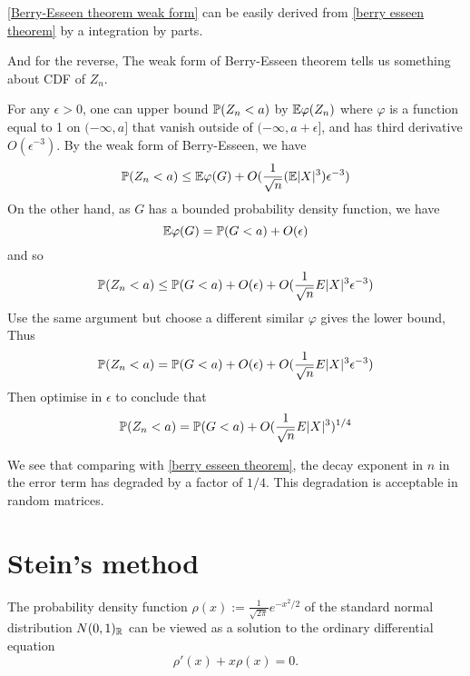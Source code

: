 \ref{Berry-Esseen theorem weak form} can be easily derived from \ref{berry esseen theorem} by a integration by parts. 

And for the reverse, The weak form of Berry-Esseen theorem tells us something about CDF of $Z_n$.

For any $\epsilon > 0$, one can upper bound $\mathbb{P}(Z_n<a)$ by $\mathbb{E} \varphi(Z_n)$ where $\varphi$ is a function equal to 1 on $(-\infty,a]$ that vanish outside of $(-\infty,a+\epsilon]$, and has third derivative $O(\epsilon^{-3})$. By the weak form of Berry-Esseen, we have 
\begin{equation*}
    \mathbb{P}(Z_n<a)\leq \mathbb{E} \varphi(G)+O(\frac{1}{\sqrt{n}}(\mathbb{E} |X|^3)\epsilon^{-3})
\end{equation*}
On the other hand, as $G$ has a bounded probability density function, we have
\begin{equation*}
    \mathbb{E} \varphi(G) = \mathbb{P}(G<a)+O(\epsilon)
\end{equation*}
and so 
\begin{equation*}
    \mathbb{P}(Z_n <a)\leq \mathbb{P}(G<a)+O(\epsilon)+O(\frac{1}{\sqrt{n}}E|X|^3\epsilon^{-3})
\end{equation*}
Use the same argument but choose a different similar $\varphi$ gives the lower bound, Thus
\begin{equation*}
    \mathbb{P}(Z_n <a)= \mathbb{P}(G<a)+O(\epsilon)+O(\frac{1}{\sqrt{n}}E|X|^3\epsilon^{-3})
\end{equation*}
Then optimise in $\epsilon$ to conclude that 
\begin{equation}\label{Weak to general berry esseen}
    \mathbb{P}(Z_n<a) = \mathbb{P}(G<a)+O(\frac{1}{\sqrt{n}}E|X|^3)^{1/4}
\end{equation}

We see that comparing with \ref{berry esseen theorem}, the decay exponent in $n$ in the error term has degraded by a factor of $1/4$. This degradation is acceptable in random matrices.

\section{Stein's method}

The probability density function $\rho(x) := \frac{1}{\sqrt{2\pi}}e^{-x^2/2} $ of the standard normal distribution $N(0,1)_{\mathbb{R}}$ can be viewed as a solution to the ordinary differential equation
\begin{equation}
    \label{differential equation result in gaussian density}
    \rho'(x)+x\rho(x)=0.
\end{equation}

